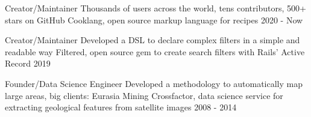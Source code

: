 
\begin{cventries}

  \cvblitz
    {Creator/Maintainer}
    {Thousands of users across the world, tens contributors, 500+ stars on GitHub} %
    {Cooklang, open source markup language for recipes} %
    {} %
    {2020 - Now} %

  \cvblitz
    {Creator/Maintainer}
    {Developed a DSL to declare complex filters in a simple and readable way} %
    {Filtered, open source gem to create search filters with Rails’ Active Record} %
    {} %
    {2019} %

  \cvblitz
    {Founder/Data Science Engineer}
    {Developed a methodology to automatically map large areas, big clients: Eurasia Mining} %
    {Crossfactor, data science service for extracting geological features from satellite images} %
    {} %
    {2008 - 2014} %


\end{cventries}
